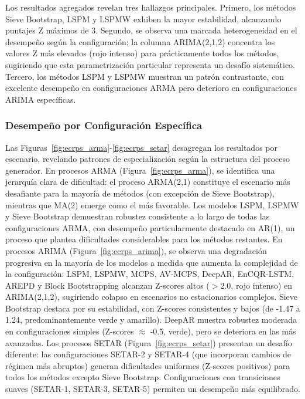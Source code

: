 Los resultados agregados revelan tres hallazgos principales. Primero, los métodos Sieve Bootstrap, LSPM y LSPMW exhiben la mayor estabilidad, alcanzando puntajes Z máximos de 3. Segundo, se observa una marcada heterogeneidad en el desempeño según la configuración: la columna ARIMA(2,1,2) concentra los valores Z más elevados (rojo intenso) para prácticamente todos los métodos, sugiriendo que esta parametrización particular representa un desafío sistemático. Tercero, los métodos LSPM y LSPMW muestran un patrón contrastante, con excelente desempeño en configuraciones ARMA pero deterioro en configuraciones ARIMA específicas.

\subsubsection{Desempeño por Configuración Específica}
Las Figuras~\ref{fig:ecrps_arma}-\ref{fig:ecrps_setar} desagregan los resultados por escenario, revelando patrones de especializaci\'on seg\'un la estructura del proceso generador. En procesos ARMA (Figura~\ref{fig:ecrps_arma}), se identifica una jerarqu\'ia clara de dificultad: el proceso ARMA(2,1) constituye el escenario m\'as desafiante para la mayor\'ia de m\'etodos (con excepci\'on de Sieve Bootstrap), mientras que MA(2) emerge como el m\'as favorable. Los modelos LSPM, LSPMW y Sieve Bootstrap demuestran robustez consistente a lo largo de todas las configuraciones ARMA, con desempe\~no particularmente destacado en AR(1), un proceso que plantea dificultades considerables para los m\'etodos restantes. En procesos ARIMA (Figura~\ref{fig:ecrps_arima}), se observa una degradaci\'on progresiva en la mayor\'ia de los modelos a medida que aumenta la complejidad de la configuraci\'on: LSPM, LSPMW, MCPS, AV-MCPS, DeepAR, EnCQR-LSTM, AREPD y Block Bootstrapping alcanzan Z-scores altos ($>$2.0, rojo intenso) en ARIMA(2,1,2), sugiriendo colapso en escenarios no estacionarios complejos. Sieve Bootstrap destaca por su estabilidad, con Z-scores consistentes y bajos (de -1.47 a 1.24, predominantemente verde y amarillo). DeepAR muestra robustez moderada en configuraciones simples (Z-scores $\approx$ -0.5, verde), pero se deteriora en las m\'as avanzadas. Los procesos SETAR (Figura~\ref{fig:ecrps_setar}) presentan un desaf\'io diferente: las configuraciones SETAR-2 y SETAR-4 (que incorporan cambios de r\'egimen m\'as abruptos) generan dificultades uniformes (Z-scores positivos) para todos los m\'etodos excepto Sieve Bootstrap. Configuraciones con transiciones suaves (SETAR-1, SETAR-3, SETAR-5) permiten un desempe\~no m\'as equilibrado.

